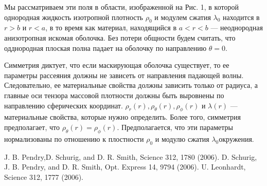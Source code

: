 \documentclass[a4paper, 12pt]{article}
\begin{document}
Мы рассматриваем эти поля в области, изображенной на Рис. 1, в которой
однородная жидкость изотропной плотность $\rho_0$ и модулем сжатия
$\lambda_0$ находится в $r>b$ и $r<a$, в то время как материал, находящийся в
 $a<r<b$ --- неоднородная анизотропная искомая оболочка. Без потери общности будем 
 считать, что одднородная плоская полна падает на оболочку
  по направлению $\theta=0$.

 Симметрия диктует, что если маскирующая оболочка существует, то ее параметры
 рассеяния должны не зависеть от направления падающей волны. Следовательно, 
 ее материальные свойства должны зависить только от радиуса, а главные оси
 тензора массовой плотности должны быть выровнены по направлению сферических
 координат. $\rho_r(r), \rho_\theta(r), \rho_\phi(r)$ и $\lambda(r)$ --- 
 материальные свойства, которые нужно определить. Более того, симметрия 
 предполагает, что $\rho_\theta(r)=\rho_\phi(r)$. Предполагается, что эти параметры
 нормализованы по отношению к плостности $\rho_0$ и модулю сжатия $\lambda_0$окружения.
\begin{thebibliography}{99}
J. B. Pendry,D. Schurig, and D. R. Smith, Science 312, 1780 (2006).
D. Schurig, J. B. Pendry, and D. R. Smith, Opt. Express 14,
9794 (2006).
U. Leonhardt, Science 312, 1777 (2006).

\end{thebibliography}
\end{document}
